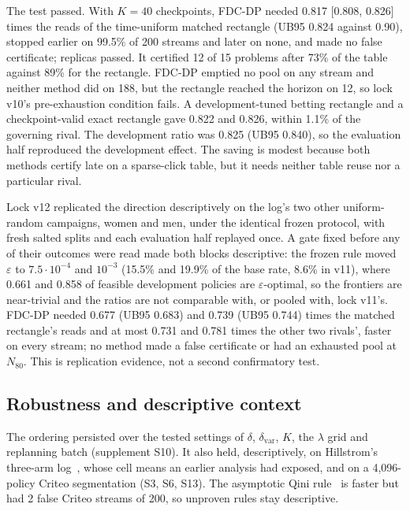 \documentclass[sigconf,anonymous,review]{acmart}
\newcommand{\eps}{\varepsilon}
\newcommand{\dvar}{\delta_{\text{var}}}
\begin{document}
The test passed. With $K = 40$ checkpoints, FDC-DP needed 0.817 [0.808, 0.826] times the reads of the time-uniform matched rectangle (UB95 0.824 against 0.90), stopped earlier on 99.5\% of 200 streams and later on none, and made no false certificate; replicas passed. It certified 12 of 15 problems after 73\% of the table against 89\% for the rectangle. FDC-DP emptied no pool on any stream and neither method did on 188, but the rectangle reached the horizon on 12, so lock v10's pre-exhaustion condition fails. A development-tuned betting rectangle and a checkpoint-valid exact rectangle gave 0.822 and 0.826, within 1.1\% of the governing rival. The development ratio was 0.825 (UB95 0.840), so the evaluation half reproduced the development effect. The saving is modest because both methods certify late on a sparse-click table, but it needs neither table reuse nor a particular rival.

Lock v12 replicated the direction descriptively on the log's two other uniform-random campaigns, women and men, under the identical frozen protocol, with fresh salted splits and each evaluation half replayed once. A gate fixed before any of their outcomes were read made both blocks descriptive: the frozen rule moved $\eps$ to $7.5 \cdot 10^{-4}$ and $10^{-3}$ (15.5\% and 19.9\% of the base rate, 8.6\% in v11), where 0.661 and 0.858 of feasible development policies are $\eps$-optimal, so the frontiers are near-trivial and the ratios are not comparable with, or pooled with, lock v11's. FDC-DP needed 0.677 (UB95 0.683) and 0.739 (UB95 0.744) times the matched rectangle's reads and at most 0.731 and 0.781 times the other two rivals', faster on every stream; no method made a false certificate or had an exhausted pool at $N_{80}$. This is replication evidence, not a second confirmatory test.

\subsection{Robustness and descriptive context}\label{sec:external}

The ordering persisted over the tested settings of $\delta$, $\dvar$, $K$, the $\lambda$ grid and replanning batch (supplement S10). It also held, descriptively, on Hillstrom's three-arm log~\citep{hillstrom2008minethatdata}, whose cell means an earlier analysis had exposed, and on a 4,096-policy Criteo segmentation (S3, S6, S13). The asymptotic Qini rule~\citep{sverdrup2023qini} is faster but had 2 false Criteo streams of 200, so unproven rules stay descriptive.
\end{document}
